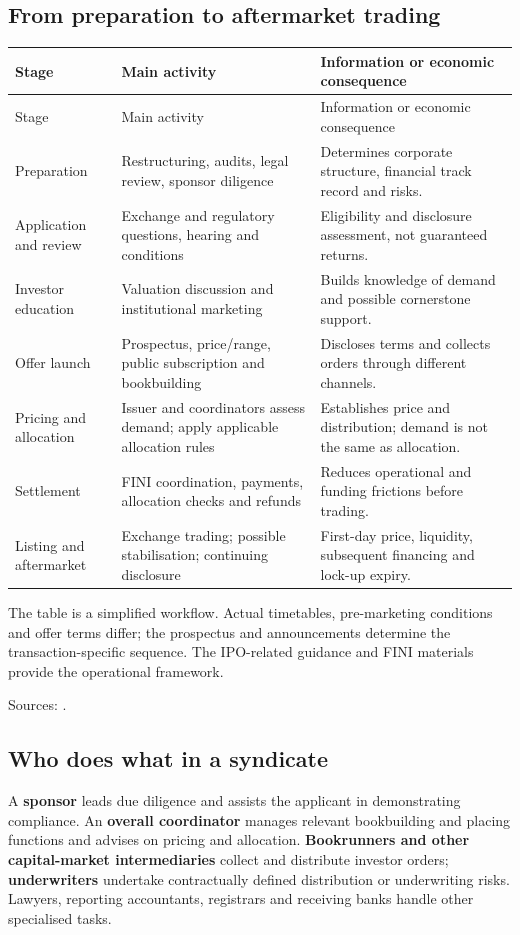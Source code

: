 \documentclass[11pt,a4paper]{article}
\newcommand{\source}[1]{\par{\footnotesize\color{ink}Sources: \cite{#1}.}\par}
\begin{document}
\subsection{From preparation to aftermarket trading}
\begin{longtable}{@{}L{2.7cm}L{7.0cm}L{5.8cm}@{}}
\toprule Stage & Main activity & Information or economic consequence\\\midrule\endfirsthead
\toprule Stage & Main activity & Information or economic consequence\\\midrule\endhead
Preparation & Restructuring, audits, legal review, sponsor diligence & Determines corporate structure, financial track record and risks.\\
Application and review & Exchange and regulatory questions, hearing and conditions & Eligibility and disclosure assessment, not guaranteed returns.\\
Investor education & Valuation discussion and institutional marketing & Builds knowledge of demand and possible cornerstone support.\\
Offer launch & Prospectus, price/range, public subscription and bookbuilding & Discloses terms and collects orders through different channels.\\
Pricing and allocation & Issuer and coordinators assess demand; apply applicable allocation rules & Establishes price and distribution; demand is not the same as allocation.\\
Settlement & FINI coordination, payments, allocation checks and refunds & Reduces operational and funding frictions before trading.\\
Listing and aftermarket & Exchange trading; possible stabilisation; continuing disclosure & First-day price, liquidity, subsequent financing and lock-up expiry.\\
\bottomrule
\end{longtable}
The table is a simplified workflow. Actual timetables, pre-marketing conditions and offer terms differ; the prospectus and announcements determine the transaction-specific sequence. The IPO-related guidance and FINI materials provide the operational framework.\source{sponsor,fini}

\subsection{Who does what in a syndicate}
A \textbf{sponsor} leads due diligence and assists the applicant in demonstrating compliance. An \textbf{overall coordinator} manages relevant bookbuilding and placing functions and advises on pricing and allocation. \textbf{Bookrunners and other capital-market intermediaries} collect and distribute investor orders; \textbf{underwriters} undertake contractually defined distribution or underwriting risks. Lawyers, reporting accountants, registrars and receiving banks handle other specialised tasks.
\end{document}
